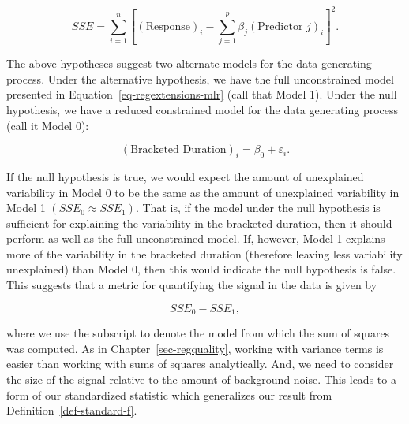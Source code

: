 \documentclass[
  letterpaper,
  DIV=11,
  numbers=noendperiod]{scrreprt}
\theoremstyle{definition}
\theoremstyle{definition}
\theoremstyle{plain}
\theoremstyle{remark}
\begin{document}
\[SSE = \sum_{i=1}^{n}\left[(\text{Response})_i - \sum_{j=1}^{p} \beta_j (\text{Predictor } j)_i\right]^2.\]

The above hypotheses suggest two alternate models for the data
generating process. Under the alternative hypothesis, we have the full
unconstrained model presented in Equation~\ref{eq-regextensions-mlr}
(call that Model 1). Under the null hypothesis, we have a reduced
constrained model for the data generating process (call it Model 0):

\[(\text{Bracketed Duration})_i = \beta_0 + \varepsilon_i.\]

If the null hypothesis is true, we would expect the amount of
unexplained variability in Model 0 to be the same as the amount of
unexplained variability in Model 1 \(\left(SSE_0 \approx SSE_1\right)\).
That is, if the model under the null hypothesis is sufficient for
explaining the variability in the bracketed duration, then it should
perform as well as the full unconstrained model. If, however, Model 1
explains more of the variability in the bracketed duration (therefore
leaving less variability unexplained) than Model 0, then this would
indicate the null hypothesis is false. This suggests that a metric for
quantifying the signal in the data is given by

\[SSE_0 - SSE_1,\]

where we use the subscript to denote the model from which the sum of
squares was computed. As in Chapter~\ref{sec-regquality}, working with
variance terms is easier than working with sums of squares analytically.
And, we need to consider the size of the signal relative to the amount
of background noise. This leads to a form of our standardized statistic
which generalizes our result from Definition~\ref{def-standard-f}.
\end{document}

